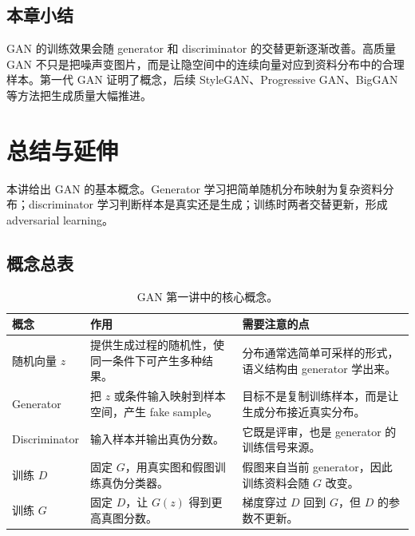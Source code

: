 \documentclass[a4paper]{article}
\begin{document}
\subsection{本章小结}

GAN 的训练效果会随 generator 和 discriminator 的交替更新逐渐改善。高质量 GAN 不只是把噪声变图片，而是让隐空间中的连续向量对应到资料分布中的合理样本。第一代 GAN 证明了概念，后续 StyleGAN、Progressive GAN、BigGAN 等方法把生成质量大幅推进。

\section{总结与延伸}

本讲给出 GAN 的基本概念。Generator 学习把简单随机分布映射为复杂资料分布；discriminator 学习判断样本是真实还是生成；训练时两者交替更新，形成 adversarial learning。

\subsection{概念总表}

\begin{table}[H]
    \centering
    \begin{tabular}{@{}L{0.23\textwidth}L{0.32\textwidth}L{0.33\textwidth}@{}}
        \toprule
        概念 & 作用 & 需要注意的点 \\
        \midrule
        随机向量 $z$ & 提供生成过程的随机性，使同一条件下可产生多种结果。 & 分布通常选简单可采样的形式，语义结构由 generator 学出来。 \\
        Generator & 把 $z$ 或条件输入映射到样本空间，产生 fake sample。 & 目标不是复制训练样本，而是让生成分布接近真实分布。 \\
        Discriminator & 输入样本并输出真伪分数。 & 它既是评审，也是 generator 的训练信号来源。 \\
        训练 $D$ & 固定 $G$，用真实图和假图训练真伪分类器。 & 假图来自当前 generator，因此训练资料会随 $G$ 改变。 \\
        训练 $G$ & 固定 $D$，让 $G(z)$ 得到更高真图分数。 & 梯度穿过 $D$ 回到 $G$，但 $D$ 的参数不更新。 \\
        \bottomrule
    \end{tabular}
    \caption{GAN 第一讲中的核心概念。}
    \label{tab:gan-concepts}
\end{table}
\end{document}
